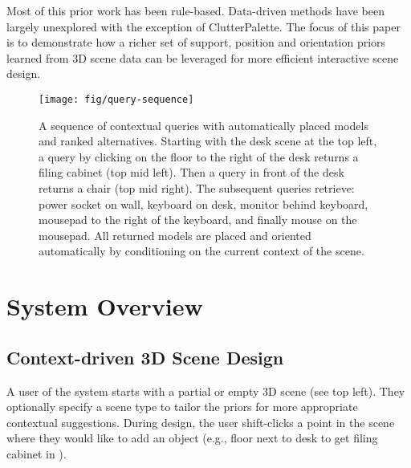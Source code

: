 \documentclass{sigchi}
\begin{document}
Most of this prior work has been rule-based.  Data-driven methods have been largely unexplored with the exception of ClutterPalette.  The focus of this paper is to demonstrate how a richer set of support, position and orientation priors learned from 3D scene data can be leveraged for more efficient interactive scene design.



\begin{figure*}
  \texttt{[image: fig/query-sequence]}
  \caption{A sequence of contextual queries with automatically placed models and ranked alternatives.  Starting with the desk scene at the top left, a query by clicking on the floor to the right of the desk returns a filing cabinet (top mid left). Then a query in front of the desk returns a chair (top mid right). The subsequent queries retrieve: power socket on wall, keyboard on desk, monitor behind keyboard, mousepad to the right of the keyboard, and finally mouse on the mousepad.  All returned models are placed and oriented automatically by conditioning on the current context of the scene.}
  \label{fig:query-sequence}
\end{figure*}


\section{System Overview}

\subsection{Context-driven 3D Scene Design}

A user of the \SceneSuggest system starts with a partial or empty 3D scene (see  top left).  They optionally specify a scene type to tailor the priors for more appropriate contextual suggestions.  During design, the user shift-clicks a point in the scene where they would like to add an object (e.g., floor next to desk to get filing cabinet in ).
\end{document}
